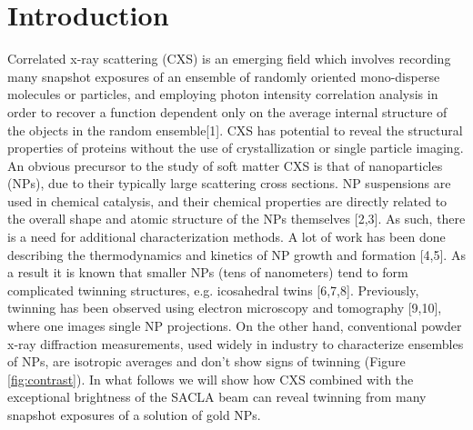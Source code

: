 \documentclass [11pt,fleqn]{article}
\begin{document}
\section{Introduction}
Correlated x-ray scattering (CXS) is an emerging field which involves recording many snapshot exposures of an ensemble of randomly oriented mono-disperse molecules or particles, and employing photon intensity correlation analysis in order to recover a function dependent only on the average internal structure of the objects in the random ensemble[1]. CXS has potential to reveal the structural properties of proteins without the use of crystallization or single particle imaging. An obvious precursor to the study of soft matter CXS is that of nanoparticles (NPs), due to their typically large scattering cross sections. NP suspensions are used in chemical catalysis, and their chemical properties are directly related to  the overall shape and atomic structure of the NPs themselves [2,3]. As such, there is a need for additional characterization methods. A lot of work has been done describing the thermodynamics and kinetics of NP growth and formation [4,5]. As a result it is known that smaller NPs (tens of nanometers) tend to form complicated twinning structures, e.g. icosahedral twins [6,7,8]. Previously, twinning has been observed using electron microscopy and tomography [9,10], where one images single NP projections. On the other hand, conventional powder x-ray diffraction measurements, used widely in industry to characterize ensembles of NPs, are isotropic averages and don't show signs of twinning (Figure \ref{fig:contrast}). In what follows we will show how CXS combined with the exceptional brightness of the SACLA beam can reveal twinning from many snapshot exposures of a solution of gold NPs.
\end{document}
